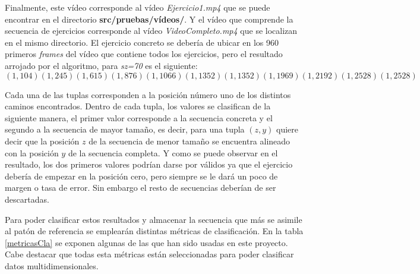 Finalmente, este vídeo corresponde al vídeo \textit{Ejercicio1.mp4} que se puede encontrar en el directorio \textbf{src/pruebas/vídeos/}. Y el vídeo que comprende la secuencia de ejercicios corresponde al vídeo \textit{VideoCompleto.mp4} que se localizan en el mismo directorio. El ejercicio concreto se debería de ubicar en los 960 primeros \textit{frames} del vídeo que contiene todos los ejercicios, pero el resultado arrojado por el algoritmo, para \textit{sz=70} es el siguiente:
{\tiny \[ (1, 104) (1, 245) (1, 615) (1, 876) (1, 1066) (1, 1352) (1, 1352) (1, 1969) (1, 2192) (1, 2528) (1, 2528)\]}

Cada una de las tuplas corresponden a la posición número uno de los distintos caminos encontrados. Dentro de cada tupla, los valores se clasifican de la siguiente manera, el primer valor corresponde a la secuencia concreta y el segundo a la secuencia de mayor tamaño, es decir, para una tupla $(z,y)$ quiere decir que la posición $z$ de la secuencia de menor tamaño se encuentra alineado con la posición $y$ de la secuencia completa. Y como se puede observar en el resultado, los dos primeros valores podrían darse por válidos ya que el ejercicio debería de empezar en la posición cero, pero siempre se le dará un poco de margen o tasa de error. Sin embargo el resto de secuencias deberían de ser descartadas.


Para poder clasificar estos resultados y almacenar la secuencia que más se asimile al patón de referencia se emplearán distintas métricas de clasificación. En la tabla \ref{metricasCla} se exponen algunas de las que han sido usadas en este proyecto. Cabe destacar que todas esta métricas están seleccionadas para poder clasificar datos multidimensionales.



